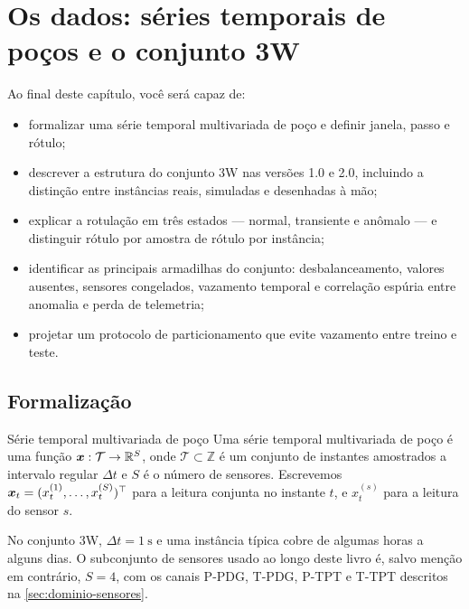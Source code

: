 \chapter{Os dados: séries temporais de poços e o conjunto 3W}
\label{cap:dados}

\begin{objetivos}
Ao final deste capítulo, você será capaz de:
\begin{itemize}[leftmargin=*,itemsep=0.2em]
  \item formalizar uma série temporal multivariada de poço e definir janela, passo e
        rótulo;
  \item descrever a estrutura do conjunto 3W nas versões 1.0 e 2.0, incluindo a
        distinção entre instâncias reais, simuladas e desenhadas à mão;
  \item explicar a rotulação em três estados --- normal, transiente e anômalo --- e
        distinguir rótulo por amostra de rótulo por instância;
  \item identificar as principais armadilhas do conjunto: desbalanceamento, valores
        ausentes, sensores congelados, vazamento temporal e correlação espúria entre
        anomalia e perda de telemetria;
  \item projetar um protocolo de particionamento que evite vazamento entre treino e
        teste.
\end{itemize}
\end{objetivos}

\section{Formalização}

\begin{definicao}{Série temporal multivariada de poço}
Uma série temporal multivariada de poço é uma função
$\bm{x} : \mathcal{T} \to \mathbb{R}^{S}$, onde $\mathcal{T} \subset \mathbb{Z}$ é um
conjunto de instantes amostrados a intervalo regular $\Delta t$ e $S$ é o número de
sensores. Escrevemos $\bm{x}_t = (x_t^{(1)}, \dots, x_t^{(S)})^{\top}$ para a leitura
conjunta no instante $t$, e $x_t^{(s)}$ para a leitura do sensor $s$.
\end{definicao}

No conjunto 3W, $\Delta t = \SI{1}{\second}$ e uma instância típica cobre de algumas
horas a alguns dias. O subconjunto de sensores usado ao longo deste livro é, salvo
menção em contrário, $S = 4$, com os canais P-PDG, T-PDG, P-TPT e T-TPT descritos na
\cref{sec:dominio-sensores}.

